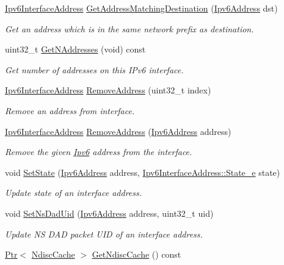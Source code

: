 \begin{DoxyCompactItemize}
\hyperlink{classns3_1_1Ipv6InterfaceAddress}{Ipv6\+Interface\+Address} \hyperlink{classns3_1_1Ipv6Interface_a476d272f8663e4d22c6ceb59300eb834}{Get\+Address\+Matching\+Destination} (\hyperlink{classns3_1_1Ipv6Address}{Ipv6\+Address} dst)
\begin{DoxyCompactList}\small\item\em Get an address which is in the same network prefix as destination. \end{DoxyCompactList}\item 
uint32\+\_\+t \hyperlink{classns3_1_1Ipv6Interface_ade16acbaaafcdd22f2de3ee7486cc778}{Get\+N\+Addresses} (void) const 
\begin{DoxyCompactList}\small\item\em Get number of addresses on this I\+Pv6 interface. \end{DoxyCompactList}\item 
\hyperlink{classns3_1_1Ipv6InterfaceAddress}{Ipv6\+Interface\+Address} \hyperlink{classns3_1_1Ipv6Interface_a04fe29c27e9095b01a7e8d6c04d3f3ea}{Remove\+Address} (uint32\+\_\+t index)
\begin{DoxyCompactList}\small\item\em Remove an address from interface. \end{DoxyCompactList}\item 
\hyperlink{classns3_1_1Ipv6InterfaceAddress}{Ipv6\+Interface\+Address} \hyperlink{classns3_1_1Ipv6Interface_a00ec7b4a612c874730444248a9387248}{Remove\+Address} (\hyperlink{classns3_1_1Ipv6Address}{Ipv6\+Address} address)
\begin{DoxyCompactList}\small\item\em Remove the given \hyperlink{classns3_1_1Ipv6}{Ipv6} address from the interface. \end{DoxyCompactList}\item 
void \hyperlink{classns3_1_1Ipv6Interface_af12aa1156e1c24b040dc3a409fc87bfe}{Set\+State} (\hyperlink{classns3_1_1Ipv6Address}{Ipv6\+Address} address, \hyperlink{classns3_1_1Ipv6InterfaceAddress_aa01e95b0e78bf3f0200a98f6bfe64f07}{Ipv6\+Interface\+Address\+::\+State\+\_\+e} state)
\begin{DoxyCompactList}\small\item\em Update state of an interface address. \end{DoxyCompactList}\item 
void \hyperlink{classns3_1_1Ipv6Interface_a9f683ed2c54577e8c89f23899f91fea0}{Set\+Ns\+Dad\+Uid} (\hyperlink{classns3_1_1Ipv6Address}{Ipv6\+Address} address, uint32\+\_\+t uid)
\begin{DoxyCompactList}\small\item\em Update NS D\+AD packet U\+ID of an interface address. \end{DoxyCompactList}\item 
\hyperlink{classns3_1_1Ptr}{Ptr}$<$ \hyperlink{classns3_1_1NdiscCache}{Ndisc\+Cache} $>$ \hyperlink{classns3_1_1Ipv6Interface_a7b9bc6613eadd6784b870601a73dcf04}{Get\+Ndisc\+Cache} () const 
\end{DoxyCompactItemize}
